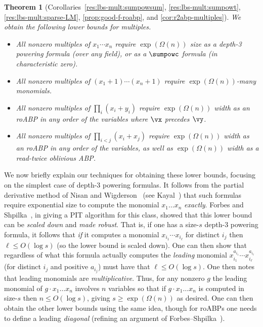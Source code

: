 \documentclass[11pt]{article}
\numberwithin{equation}{section}
\newtheorem{theorem}{Theorem}[section]
\theoremstyle{definition}
\theoremstyle{plain}
\begin{document}
\begin{theorem}[Corollaries~\ref{res:lbs-mult:sumpowsum}, \ref{res:lbs-mult:sumpowt}, \ref{res:lbs-mult:sparse-LM}, \ref{prop:good-f-roabp}, and \ref{cor:r2abp-multiples}]
        We obtain the following lower bounds for multiples.

        \begin{itemize}
        \item All nonzero multiples of $x_1\cdots x_n$ require
$\exp(\Omega(n))$ size
as a depth-3 powering formula (over any field), or as a $\sumpowc$ formula (in characteristic zero).
\item All nonzero multiples of $(x_1+1)\cdots (x_n+1)$ require $\exp(\Omega(n))$-many monomials.
\item All nonzero multiples of $\prod_i (x_i+y_i)$ require
$\exp(\Omega(n))$ width as an roABP in any
order of the variables where $\vx$ precedes $\vy$.
\item All nonzero multiples of $\prod_{i<j} (x_i+x_j)$ require
$\exp(\Omega(n))$ width as an roABP in any
order of the variables, as well as
$\exp(\Omega(n))$ width as a read-twice oblivious ABP.
                        \qedhere
        \end{itemize}
\end{theorem}

We now briefly explain our techniques for obtaining these lower bounds, focusing on the simplest case of depth-3 powering formulas.  It follows from the partial derivative method of Nisan and Wigderson~\cite{NisanWigderson94} (see Kayal~\cite{Kayal08}) that such formulas require exponential size to compute the monomial $x_1\ldots x_n$ \emph{exactly}.  Forbes and Shpilka~\cite{ForbesShpilka13a}, in giving a PIT algorithm for this class, showed that this lower bound can be \emph{scaled down} and \emph{made robust}.  That is, if one has a size-$s$ depth-3 powering formula, it follows that \emph{if} it computes a monomial $x_{i_1}\cdots x_{i_\ell}$ for distinct $i_j$ then $\ell\le O(\log s)$ (so the lower bound is scaled down).  One can then show that regardless of what this formula actually computes the \emph{leading} monomial $x_{i_1}^{a_{i_1}}\cdots x_{i_\ell}^{a_{i_\ell}}$ (for distinct $i_j$ and positive $a_{i_j}$) must have that $\ell\le O(\log s)$.  One then notes that leading monomials are \emph{multiplicative}.  Thus, for any nonzero $g$ the leading monomial of $g\cdot x_1\ldots x_n$ involves $n$ variables so that if $g\cdot x_1\ldots x_n$ is computed in size-$s$ then $n\le O(\log s)$, giving $s\ge\exp(\Omega(n))$ as desired.  One can then obtain the other lower bounds using the same idea, though for roABPs one needs to define a leading \emph{diagonal} (refining an argument of  Forbes--Shpilka~\cite{ForbesShpilka12}).
\end{document}
